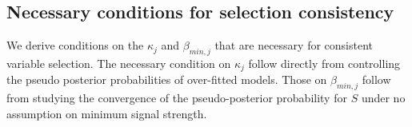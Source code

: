 \documentclass[aos]{imsart}
\theoremstyle{plain}
\newcommand{\paul}[1]{{\small{\color{green} \sf $\spadesuit$ Paul: #1}}}
\newcommand{\bs}{\boldsymbol}
\begin{document}
\subsection{Necessary conditions for selection consistency}

We derive conditions on the $\kappa_j$ and $\beta_{min,j}$ that are necessary for consistent variable selection. The necessary condition on $\kappa_j$ follow directly from controlling the pseudo posterior probabilities of over-fitted models. Those on $\beta_{min,j}$ follow from studying the convergence of the pseudo-posterior probability for $S$ under no assumption on minimum signal strength. 

\end{document}
